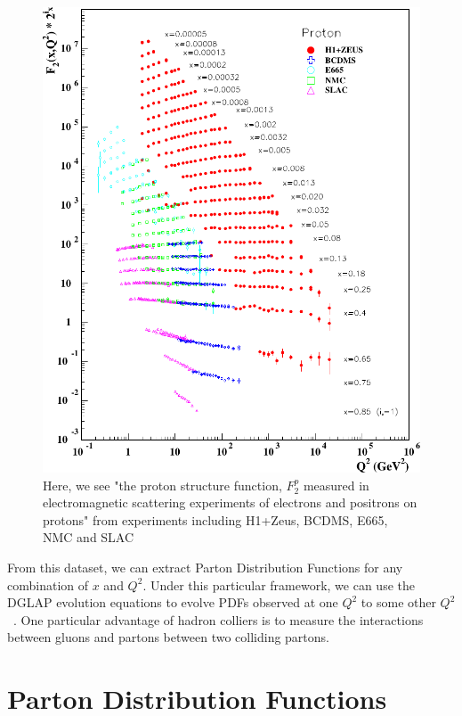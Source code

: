 \begin{figure}
  \centering
  \includegraphics[width=\linewidth]{./figures/F2_structure_function.pdf}
  \caption{
		Here, we see "the proton structure function, $F_2^p$ measured in
		electromagnetic scattering experiments of electrons and positrons on
		protons" from experiments including H1+Zeus, BCDMS, E665, NMC and
		SLAC~\cite{ReviewEidelman2012}
  }
  \label{fig:f2_world_data}
\end{figure}

From this dataset, we can extract Parton Distribution Functions for any
combination of $x$ and $Q^2$. Under this particular framework, we can use the
DGLAP evolution equations to evolve PDFs observed at one $Q^2$ to some other
$Q^2$~\cite{Altarelli2009}. One particular advantage of hadron colliers is to
measure the interactions between gluons and partons between two colliding
partons. 

\section{Parton Distribution Functions}

